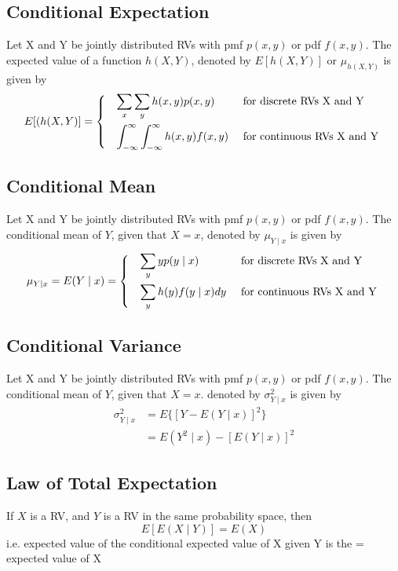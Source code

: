 \documentclass[a4paper]{article}
\begin{document}
\subsection{Conditional Expectation}
Let X and Y be jointly distributed RVs with pmf $p(x, y)$ or pdf $f(x, y)$. The expected value of a function $h(X, Y)$, denoted by $E[h(X, Y)]$ or $\mu_{h(X, Y)}$ is given by
\begin{align*}
    E[(h(X, Y)] =
    \begin{dcases*}
    \quad \sum_{x}\sum_{y}h(x, y)p(x, y) &\mbox{} \text{for discrete RVs X and Y}\\
    \quad \int_{-\infty}^{\infty}\int_{-\infty}^{\infty}h(x, y)f(x, y) &\mbox{} \text{for continuous RVs X and Y}
    \end{dcases*}
\end{align*}
\subsection{Conditional Mean}
Let X and Y be jointly distributed RVs with pmf $p(x, y)$ or pdf $f(x, y)$. The conditional mean of $Y$, given that $X = x$, denoted by $\mu_{Y\mid x}$ is given by
\begin{align*}
    \mu_{Y\mid x} = E(Y\mid x) = \begin{dcases*}
    \quad \sum_{y}yp(y\mid x) &\mbox{} \text{for discrete RVs X and Y} \\
    \quad \sum_{y}h(y)f(y\mid x) dy &\mbox{} \text{for continuous RVs X and Y}
    \end{dcases*}
\end{align*}
\subsection{Conditional Variance}
Let X and Y be jointly distributed RVs with pmf $p(x, y)$ or pdf $f(x, y)$. The conditional mean of $Y$, given that $X = x$. denoted by $\sigma^{2}_{Y\mid x}$ is given by
\begin{align*}
    \sigma^{2}_{Y\mid x} &= E\{[Y-E(Y\mid x)]^{2}\}\\
    &= E(Y^2\mid x) - [E(Y\mid x)]^2
\end{align*}
\subsection{Law of Total Expectation}
If $X$ is a RV, and $Y$ is a RV in the same probability space, then
$$E\left[E(X\mid Y)\right] = E(X)$$
i.e. expected value of the conditional expected value of X given Y is the =  expected value of X
\end{document}

